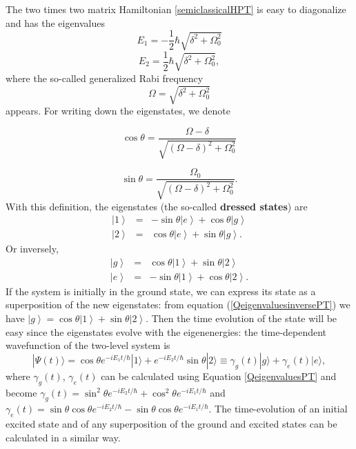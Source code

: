 \documentclass[12pt]{iopart}
\begin{document}
The two times two matrix Hamiltonian \ref{semiclassicalHPT} is easy to diagonalize and has the eigenvalues 
\begin{equation}
E_{1}=-\frac{1}{2}\hbar\sqrt{\delta^{2}+\Omega_0^{2}}\label{E1semiclassPT}\end{equation}
\begin{equation}
E_{2}=\frac{1}{2}\hbar\sqrt{\delta^{2}+\Omega_0^{2}},\label{E2semiclassPT}\end{equation}
where the so-called generalized Rabi frequency
\begin{equation}
\Omega=\sqrt{\delta^{2}+\Omega_0^{2}}\label{eq:62}\end{equation}
appears. For writing down the eigenstates, we denote

\begin{equation}
\cos\theta=\frac{\Omega-\delta}{\sqrt{\left(\Omega-\delta\right)^{2}+\Omega_0^2}}\label{eq:63}\end{equation}

\begin{equation}
\sin\theta=\frac{\Omega_0}{\sqrt{\left(\Omega-\delta\right)^{2}+
\Omega_0^2}}.\label{eq:64}\end{equation}
With this definition, the
eigenstates (the so-called {\bf dressed states}) are
\begin{eqnarray}
\left|1\right\rangle &=&-\sin\theta\left|e\right\rangle  +\cos\theta\left|g\right\rangle  \nonumber \\
\left|2\right\rangle &=&\cos\theta\left|e\right\rangle  +\sin\theta\left|g\right\rangle . \label{QeigenvaluesPT}
\end{eqnarray}
Or inversely,
\begin{eqnarray}
\left|g\right\rangle &=&\cos\theta\left|1\right\rangle  +\sin\theta\left|2\right\rangle  \nonumber \\
\left|e\right\rangle &=&-\sin\theta\left|1\right\rangle  +\cos\theta\left|2\right\rangle . \label{QeigenvaluesinversePT}
\end{eqnarray}
If the system is initially in the ground state, we can express its state as a superposition of the new eigenstates:
from equation (\ref{QeigenvaluesinversePT}) we have $\left|g\right\rangle =\cos\theta\left|1\right\rangle  +\sin\theta\left|2\right\rangle$.
Then the time evolution of the state will be easy since the eigenstates evolve with the eigenenergies: the time-dependent wavefunction of the two-level system is
\begin{equation}
| \Psi (t) \rangle = \cos\theta e^{-i E_1 t/\hbar} |1\rangle + e^{-i E_2 t/\hbar} \sin\theta|2\rangle 
\equiv \gamma_g(t) |g\rangle +  \gamma_e(t)  |e\rangle, \label{2leveltimePT}
\end{equation}
where $\gamma_g(t)$, $\gamma_e(t)$ can be calculated using Equation \ref{QeigenvaluesPT} and become 
$\gamma_g(t) = \sin^2 \theta e^{-i E_2 t/\hbar} + \cos^2 \theta e^{-i E_1 t/\hbar}$ and 
$\gamma_e(t) = \sin \theta \cos \theta e^{-i E_2 t/\hbar} - \sin\theta \cos \theta e^{-i E_1 t/\hbar}$. The time-evolution of an initial excited
state and of any superposition of the ground and excited states can be calculated in a similar way.
\end{document}
